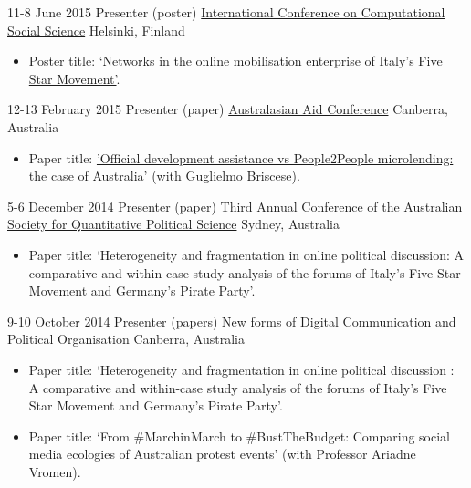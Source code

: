 \documentclass[11pt,a4paper,sans]{moderncv}
\begin{document}
    \cventry
        {11-8 June 2015} %
    {Presenter (poster)} %
    {\href{http://www.iccss2015.eu/}{International Conference on Computational Social Science}} %
    {Helsinki, Finland} %
{}
    {
      \begin{itemize} %
        \item {Poster title:  \href{http://www.francescobailo.net/wordpress/wp-content/uploads/2016/04/f_bailo_poster_iccss15_original.pdf}{`Networks in the online mobilisation enterprise of Italy's Five Star Movement'}.}
      \end{itemize}
    }

    \cventry
        {12-13 February 2015} %
    {Presenter (paper)} %
    {\href{https://devpolicy.crawford.anu.edu.au/annual-australasian-aid-conference/2015}{Australasian Aid Conference}} %
    {Canberra, Australia} %
{}
    {
      \begin{itemize} %
        \item {Paper title:  \href{http://devpolicy.org/2015-Australasian-aid-conference/presentations/2b/Guglielmo-Briscese-and-Francesco-Bailo.pdf}{'Official development assistance vs People2People microlending: the case of Australia'} (with Guglielmo Briscese).} 
      \end{itemize}
    }

    \cventry
        {5-6 December 2014} %
    {Presenter (paper)} %
    {\href{http://www.asqps.org.au/index.php/asqps/2014"}{Third Annual Conference of the Australian Society for Quantitative Political Science}} %
    {Sydney, Australia} %
{}
    {
      \begin{itemize} %
        \item {Paper title: `Heterogeneity and fragmentation in online political discussion: A comparative and within-case study analysis of the forums of Italy's Five Star Movement and Germany's Pirate Party'.}
      \end{itemize}
    }

    \cventry
    {9-10 October 2014} %
    {Presenter (papers)} %
    {New forms of Digital Communication and Political Organisation} %
    {Canberra, Australia} %
    {}
    {
      \begin{itemize} %
        \item {Paper title: `Heterogeneity and fragmentation in online political discussion : A comparative and within-case study analysis of the forums of Italy's Five Star Movement and Germany’s Pirate Party'.}
         \item{Paper title: `From \#MarchinMarch to \#BustTheBudget: Comparing social media ecologies of Australian protest events' (with Professor Ariadne Vromen).}
      \end{itemize}
    }
\end{document}
